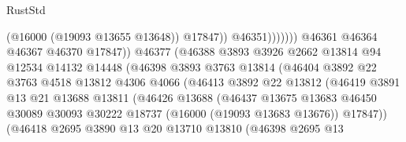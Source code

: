 \begin{lexlean}{RustStd}
\begin{coremodule}
                                                (@16000 (@19093 @13655 @13648))
                                                @17847))
                                            @46351)))))))
                              @46361
                              @46364
                              @46367
                              @46370
                              @17847))
                          @46377
                          (@46388
                            @3893
                            @3926
                            @2662
                            @13814
                            @94
                            @12534
                            @14132
                            @14448
                            (@46398
                              @3893
                              @3763
                              @13814
                              (@46404
                                @3892
                                @22
                                @3763
                                @4518
                                @13812
                                @4306
                                @4066
                                (@46413
                                  @3892
                                  @22
                                  @13812
                                  (@46419
                                    @3891
                                    @13
                                    @21
                                    @13688
                                    @13811
                                    (@46426
                                      @13688
                                      (@46437
                                        @13675
                                        @13683
                                        @46450
                                        @30089
                                        @30093
                                        @30222
                                        @18737
                                        (@16000 (@19093 @13683 @13676))
                                        @17847))
                                    (@46418
                                      @2695
                                      @3890
                                      @13
                                      @20
                                      @13710
                                      @13810
                                      (@46398
                                        @2695
                                        @13

\end{coremodule}
\end{lexlean}
